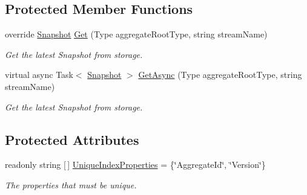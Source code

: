 \subsection*{Protected Member Functions}
\begin{DoxyCompactItemize}
\item 
override \hyperlink{classCqrs_1_1Snapshots_1_1Snapshot}{Snapshot} \hyperlink{classCqrs_1_1Azure_1_1DocumentDb_1_1Events_1_1AzureDocumentDbSnapshotStore_ac924659cdf14b06e31c57e4b1107b739_ac924659cdf14b06e31c57e4b1107b739}{Get} (Type aggregate\+Root\+Type, string stream\+Name)
\begin{DoxyCompactList}\small\item\em Get the latest Snapshot from storage. \end{DoxyCompactList}\item 
virtual async Task$<$ \hyperlink{classCqrs_1_1Snapshots_1_1Snapshot}{Snapshot} $>$ \hyperlink{classCqrs_1_1Azure_1_1DocumentDb_1_1Events_1_1AzureDocumentDbSnapshotStore_a867dbb010bdb90649d7f859ea857c915_a867dbb010bdb90649d7f859ea857c915}{Get\+Async} (Type aggregate\+Root\+Type, string stream\+Name)
\begin{DoxyCompactList}\small\item\em Get the latest Snapshot from storage. \end{DoxyCompactList}\end{DoxyCompactItemize}
\subsection*{Protected Attributes}
\begin{DoxyCompactItemize}
\item 
readonly string \mbox{[}$\,$\mbox{]} \hyperlink{classCqrs_1_1Azure_1_1DocumentDb_1_1Events_1_1AzureDocumentDbSnapshotStore_a1439bef0c7da24cdb47657852588f3fe_a1439bef0c7da24cdb47657852588f3fe}{Unique\+Index\+Properties} = \{\char`\"{}Aggregate\+Id\char`\"{}, \char`\"{}Version\char`\"{}\}
\begin{DoxyCompactList}\small\item\em The properties that must be unique. \end{DoxyCompactList}\end{DoxyCompactItemize}
